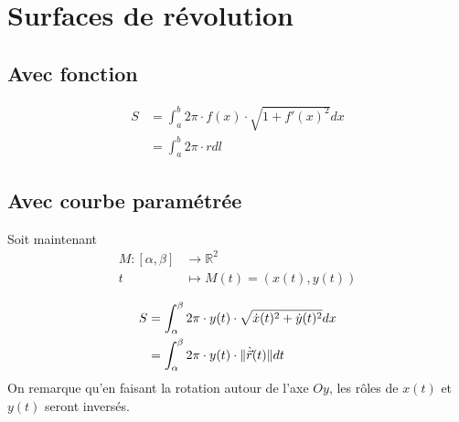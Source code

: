 \documentclass[10pt,a4paper]{book}
\newcommand{\R}{\mathbb{R}}
\DeclarePairedDelimiter\norm{\lVert}{\rVert}
\begin{document}
\section{Surfaces de révolution}

\subsection{Avec fonction}
\begin{equation*}
\begin{split}
S &= \int_a^b 2\pi \cdot f(x) \cdot \sqrt{1+f'(x)^2}dx \\
&= \int_a^b 2\pi\cdot rdl
\end{split}
\end{equation*}

\subsection{Avec courbe paramétrée}
Soit maintenant
\begin{equation*}
\begin{split}
M:[\alpha,\beta] & \rightarrow \R^2 \\
t & \mapsto M(t) = (x(t), y(t))
\end{split}
\end{equation*}

\begin{equation*}
\begin{split}
S &= \int_\alpha^\beta 2\pi \cdot y(t) \cdot \sqrt{\dot{x}(t)^2 + \dot{y}(t)^2}dx \\
&= \int_\alpha^\beta 2\pi\cdot y(t) \cdot \norm{\dot{\vec{r}}(t)} dt
\end{split}
\end{equation*}
On remarque qu'en faisant la rotation autour de l'axe $Oy$, les rôles de $x(t)$ et $y(t)$ seront inversés.

\end{document}
